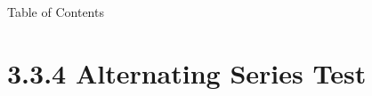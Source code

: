 

 \begin{frame}{Table of Contents }
\mapofcontentsC{\cc}
 \end{frame}

\section{3.3.4 Alternating Series Test}

